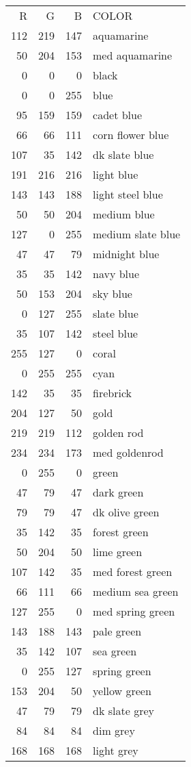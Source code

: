 \begin{tabular}{r r r l}
R & G & B &         COLOR \\
112 & 219 & 147 & aquamarine \\
50 & 204 & 153 & med aquamarine \\
0 & 0 & 0 & black  \\
0 & 0 & 255 & blue  \\
95 & 159 & 159 & cadet blue  \\
66 & 66 & 111 & corn flower blue \\
107 & 35 & 142 & dk slate blue  \\
191 & 216 & 216 & light blue  \\
143 & 143 & 188 & light steel blue \\
50 & 50 & 204 & medium blue  \\
127 & 0 & 255 & medium slate blue \\
47 & 47 & 79 & midnight blue  \\
35 & 35 & 142 & navy blue  \\
50 & 153 & 204 & sky blue  \\
0 & 127 & 255 & slate blue  \\
35 & 107 & 142 & steel blue  \\
255 & 127 & 0 & coral  \\
0 & 255 & 255 & cyan  \\
142 & 35 & 35 & firebrick  \\
204 & 127 & 50 & gold  \\
219 & 219 & 112 & golden rod  \\
234 & 234 & 173 & med goldenrod  \\
0 & 255 & 0 & green  \\
47 & 79 & 47 & dark green  \\
79 & 79 & 47 & dk olive green  \\
35 & 142 & 35 & forest green  \\
50 & 204 & 50 & lime green  \\
107 & 142 & 35 & med forest green \\
66 & 111 & 66 & medium sea green \\
127 & 255 & 0 & med spring green \\
143 & 188 & 143 & pale green  \\
35 & 142 & 107 & sea green \\
0 & 255 & 127 & spring green \\
153 & 204 & 50 & yellow green \\
47 & 79 & 79 & dk slate grey \\
84 & 84 & 84 & dim grey \\
168 & 168 & 168 & light grey \\
\end{tabular}

